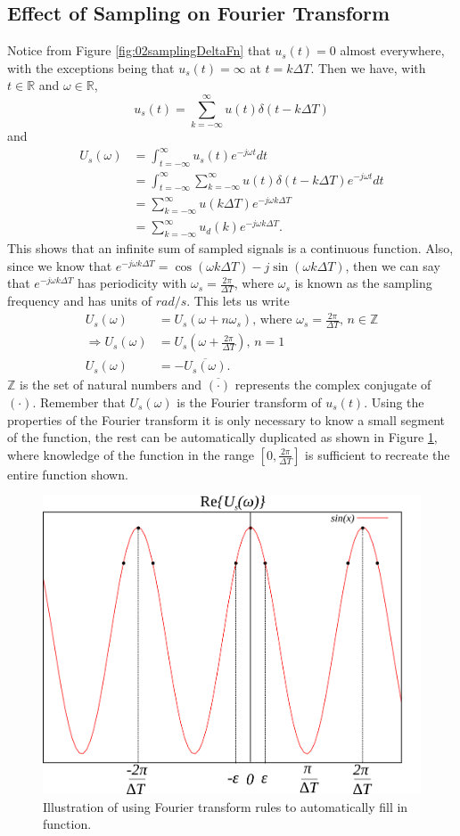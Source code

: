 \documentclass[lecture,12pt,]{pcms-l}
\theoremstyle{example}
\newcommand{\tint}{\int_{t=-\infty}^\infty}
\newcommand{\w}{\omega}
\newcommand{\emjwt}{e^{-j\omega t}}
\begin{document}
\subsection{Effect of Sampling on Fourier Transform}
Notice from Figure \ref{fig:02samplingDeltaFn} that $u_s(t) = 0$ almost everywhere, with the exceptions being that $u_s(t) = \infty$ at $t=k\Delta T$. Then we have, with $t\in\mathbb{R}$ and $\w\in\mathbb{R}$,
$$u_s(t) = \sum_{k=-\infty}^\infty u(t)\delta(t-k\Delta T)$$
and
\begin{align*}
U_s(\w) &= \tint u_s(t)\emjwt dt \\
&= \tint \sum_{k=-\infty}^\infty u(t)\delta(t-k\Delta T)\emjwt dt \\
&= \sum_{k=-\infty}^\infty u(k\Delta T) e^{-j\w k\Delta T} \\
&= \sum_{k=-\infty}^\infty u_d(k) e^{-j\w k\Delta T}.
\end{align*}
This shows that an infinite sum of sampled signals is a continuous function. Also, since we know that $e^{-j\w k\Delta T} = \cos(\w k\Delta T) - j\sin(\w k\Delta T)$, then we can say that $e^{-j\w k\Delta T}$ has periodicity with $\w_s = \frac{2\pi}{\Delta T}$, where $\w_s$ is known as the sampling frequency and has units of $rad/s$. This lets us write
\begin{align*}
U_s(\w) &= U_s(\w+n\w_s) \text{, where } \w_s = \frac{2\pi}{\Delta T} \text{, } n\in\mathbb{Z} \\
\Rightarrow U_s(\w) &= U_s(\w+\frac{2\pi}{\Delta T}) \text{, } n=1 \\
U_s(\w) &= -\overline{U_s(\w)}.
\end{align*}
$\mathbb{Z}$ is the set of natural numbers and $\overline{(\cdot)}$ represents the complex conjugate of $(\cdot)$. Remember that $U_s(\w)$ is the Fourier transform of $u_s(t)$. Using the properties of the Fourier transform it is only necessary to know a small segment of the function, the rest can be automatically duplicated as shown in Figure \ref{fig:02sin}, where knowledge of the function in the range $[0,\frac{2\pi}{\Delta T}]$ is sufficient to recreate the entire function shown.
\begin{figure}[ht!]
	\centering
	\includegraphics[width=.3\textwidth]{images/02sin}
	\caption{Illustration of using Fourier transform rules to automatically fill in function.}
	\label{fig:02sin}
\end{figure}
\end{document}
